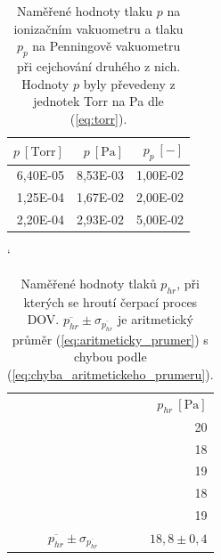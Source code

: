 \documentclass[english]{article}
\newcommand{\unit}[1]{~\mathrm{#1}}
\newcommand{\unitb}[1]{~\mathrm{[#1]}}
\begin{document}
\begin{table}[htbp]
  \centering
    \begin{tabular}{|r|r|r|}
    \hline
    \boldmath{}\textbf{$p\unit{[Torr]}$}\unboldmath{} & \boldmath{}\textbf{$p\unit{[Pa]}$}\unboldmath{} & \boldmath{}\textbf{$p_p\unit{[-]}$}\unboldmath{} \bigstrut\\
    \hline
    6,40E-05 & 8,53E-03 & 1,00E-02 \bigstrut\\
    \hline
    1,25E-04 & 1,67E-02 & 2,00E-02 \bigstrut\\
    \hline
    2,20E-04 & 2,93E-02 & 5,00E-02 \bigstrut\\
    \hline
    \end{tabular}%
  \caption{
  Naměřené hodnoty tlaku $p$ na ionizačním vakuometru a tlaku $p_p$ na Penningově vakuometru při cejchování druhého z nich. Hodnoty $p$ byly převedeny z jednotek Torr na Pa dle (\ref{eq:torr}).}
    \label{tab:cejchovani}%
\end{table}%

\begin{table}[htbp]
\catcode` %
  \centering
      \begin{tabular}{|r|r|}
  \cline{2-2}    \multicolumn{1}{r|}{} & \boldmath{}\textbf{$p_{hr}\unitb{Pa}$}\unboldmath{} \bigstrut\\
  \cline{2-2}    \multicolumn{1}{r|}{} & 20 \bigstrut\\
  \cline{2-2}    \multicolumn{1}{r|}{} & 18 \bigstrut\\
  \cline{2-2}    \multicolumn{1}{r|}{} & 19 \bigstrut\\
  \cline{2-2}    \multicolumn{1}{r|}{} & 18 \bigstrut\\
  \cline{2-2}    \multicolumn{1}{r|}{} & 19 \bigstrut\\
      \hline
      \boldmath{}\textbf{$\overline{p_{hr}}\pm\sigma_{\overline{p_{hr}}}$}\unboldmath{} & $18,8\pm0,4$ \bigstrut\\
      \hline
      \end{tabular}%
  
  \caption{Naměřené hodnoty tlaků $p_{hr}$, při kterých se hroutí čerpací proces DOV. $\overline{p_{hr}}\pm\sigma_{\overline{p_{hr}}}$ je aritmetický průměr (\ref{eq:aritmeticky_prumer}) s chybou podle (\ref{eq:chyba_aritmetickeho_prumeru}).}
  \label{tab:max}%
\end{table}%



%	
%	
\end{document}
